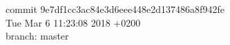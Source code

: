commit 9e7df1cc3ac84e3d6eee448e2d137486a8f942fe \\
Tue Mar 6 11:23:08 2018 +0200 \\
branch: master \\